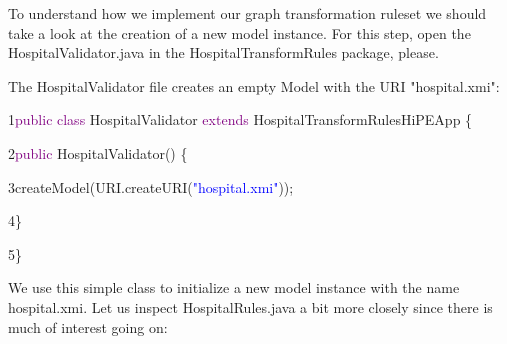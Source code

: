 To understand how we implement our graph transformation ruleset we should take a look at the creation of a new model instance. For this step, open the \textsf{HospitalValidator.java} in the \textsf{HospitalTransformRules package}, please.\newline

The HospitalValidator file creates an empty Model with the URI \textsf{"hospital.xmi"}:\newline\newline

{

1\hspace{0.5cm}\textcolor{Purple}{public class} HospitalValidator \textcolor{Purple}{extends} HospitalTransformRulesHiPEApp  \{

2\hspace{1cm}\textcolor{Purple}{public} HospitalValidator() \{

3\hspace{1.5cm}createModel(URI.createURI(\textcolor{blue}{"hospital.xmi"}));

4\hspace{1cm}\}	

5\hspace{0.5cm}\}\newline

}

We use this simple class to initialize a new model instance with the name \textsf{hospital.xmi}.\newline
Let us inspect HospitalRules.java a bit more closely since there is much of interest going on:\newline\newline 

